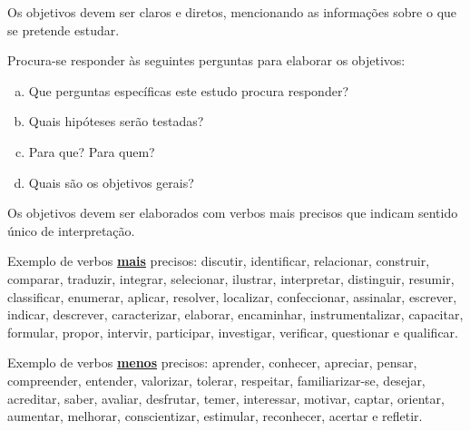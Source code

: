 \documentclass[../Main.tex]{subfiles}
\begin{document}
    Os objetivos devem ser claros e diretos, mencionando as informações sobre o que se pretende estudar.
    
    Procura-se responder às seguintes perguntas para elaborar os objetivos:
    
    \begin{enumerate}[a)]
        \item Que perguntas específicas este estudo procura responder?
        \item Quais hipóteses serão testadas?
        \item Para que? Para quem?
        \item Quais são os objetivos gerais?
    \end{enumerate}
    
    Os objetivos devem ser elaborados com verbos mais precisos que indicam sentido único de interpretação.
    
    Exemplo de verbos \textbf{\underline{mais}} precisos: discutir, identificar, relacionar, construir, comparar, traduzir, integrar, selecionar, ilustrar, interpretar, distinguir, resumir, classificar, enumerar, aplicar, resolver, localizar, confeccionar, assinalar, escrever, indicar, descrever, caracterizar, elaborar, encaminhar, instrumentalizar, capacitar, formular, propor, intervir, participar, investigar, verificar, questionar e qualificar.
    
    Exemplo de verbos \textbf{\underline{menos}} precisos: aprender, conhecer, apreciar, pensar, compreender, entender, valorizar, tolerar, respeitar, familiarizar-se, desejar, acreditar, saber, avaliar, desfrutar, temer, interessar, motivar, captar, orientar, aumentar, melhorar, conscientizar, estimular, reconhecer, acertar e refletir.
\end{document}
